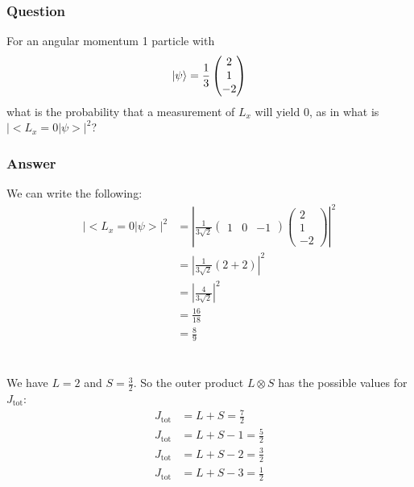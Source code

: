 \documentclass[12pt]{article}
\begin{document}
\subsubsection{Question}
For an angular momentum 1 particle with 
\begin{equation}
\ket{\psi} = \frac{1}{3}
\begin{pmatrix}
2\\
1\\
-2
\end{pmatrix}
\end{equation}
what is the probability that a measurement of $L_x$ will yield 0, as in what is $|<L_x=0|\psi>|^2$?
\subsubsection{Answer}
We can write the following:
\begin{align*}
|<L_x=0|\psi>|^2 &= |\frac{1}{3\sqrt{2}}\begin{pmatrix}
1 & 0 & -1
\end{pmatrix}\begin{pmatrix}
2\\
1\\
-2
\end{pmatrix}|^2\\
&= |\frac{1}{3\sqrt{2}}(2+2)|^2\\
&= |\frac{4}{3\sqrt{2}}|^2\\
&= \frac{16}{18}\\
&= \frac{8}{9}
\end{align*}


\section{}

\subsection{}
We have $L=2$ and $S=\frac{3}{2}$. So the outer product $L\otimes S$ has the possible values for $J_{\text{tot}}$:
\begin{align*}
J_{\text{tot}} &= L+S = \frac{7}{2}\\
J_{\text{tot}} &= L+S-1 = \frac{5}{2}\\
J_{\text{tot}} &= L+S-2 = \frac{3}{2}\\
J_{\text{tot}} &= L+S-3 = \frac{1}{2}
\end{align*}
\subsection{}
\end{document}
